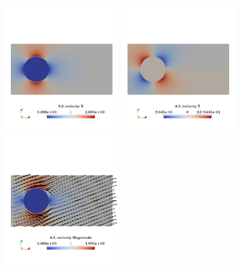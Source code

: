 \begin{center}
\includegraphics[width=5cm]{images/benchmark_heatcyl/u}
\includegraphics[width=5cm]{images/benchmark_heatcyl/w}
\includegraphics[width=5cm]{images/benchmark_heatcyl/vel}
\end{center}

